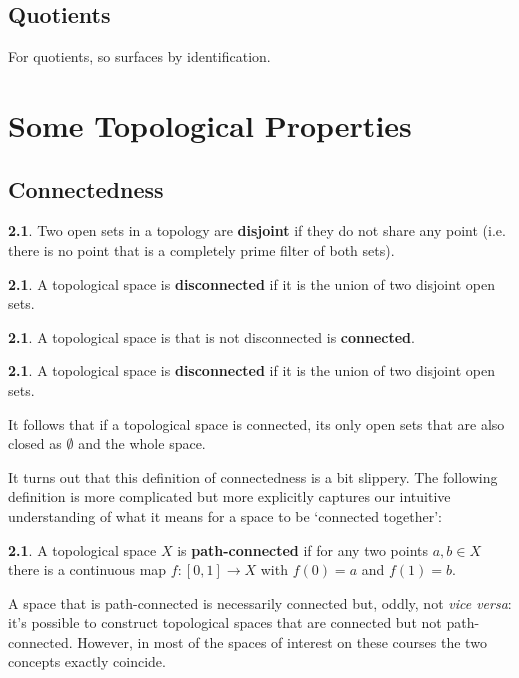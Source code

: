 \documentclass[oneside,english]{amsbook}
\numberwithin{section}{chapter}
\theoremstyle{plain}
\theoremstyle{definition}
\newtheorem{defn}[thm]{\protect\definitionname}
\providecommand{\definitionname}{Definition}
\begin{document}
\section{Quotients}

For quotients, so surfaces by identification.

\chapter{Some Topological Properties}

\section{Connectedness}

\begin{defn} 
	Two open sets in a topology are \textbf{disjoint} if they do not share any point (i.e. there is no point that is a completely prime filter of both sets).
\end{defn} 

\begin{defn} 
	A topological space is \textbf{disconnected} if it is the union of two disjoint open sets.
\end{defn} 

\begin{defn} 
	A topological space is that is not disconnected is \textbf{connected}.
\end{defn} 

\begin{defn} 
	A topological space is \textbf{disconnected} if it is the union of two disjoint open sets.
\end{defn} 

It follows that if a topological space is connected, its only open sets that are also closed as $\emptyset$ and the whole space.

It turns out that this definition of connectedness is a bit slippery. The following definition is more complicated but more explicitly captures our intuitive understanding of what it means for a space to be `connected together':

\begin{defn} 
	A topological space $X$ is \textbf{path-connected} if for any two points $a, b\in X$ there is a continuous map $f:[0, 1]\to X$ with $f(0)=a$ and $f(1)=b$.
\end{defn} 

A space that is path-connected is necessarily connected but, oddly, not \textit{vice versa}: it's possible to construct topological spaces that are connected but not path-connected. However, in most of the spaces of interest on these courses the two concepts exactly coincide.
\end{document}
